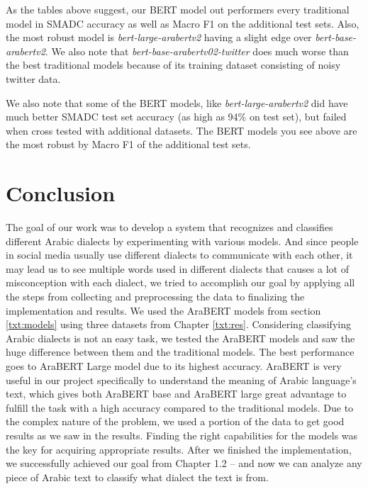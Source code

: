 \documentclass[12pt]{diazessay}
\begin{document}
    As the tables above suggest, our BERT model out performers every traditional model in SMADC accuracy as well as Macro F1 on the additional test sets. Also, the most robust model is \emph{bert-large-arabertv2} having a slight edge over \emph{bert-base-arabertv2}. We also note that \emph{bert-base-arabertv02-twitter} does much worse than the best traditional models because of its training dataset consisting of noisy twitter data.
    
    We also note that some of the BERT models, like \emph{bert-large-arabertv2} did have much better SMADC test set accuracy (as high as 94\% on test set), but failed when cross tested with additional datasets. The BERT models you see above are the most robust by Macro F1 of the additional test sets.
    
    \section {Conclusion}
    The goal of our work was to develop a system that recognizes and classifies different Arabic dialects by experimenting with various models. And since people in social media usually use different dialects to communicate with each other, it may lead us to see multiple words used in different dialects that causes a lot of misconception with each dialect, we tried to accomplish our goal by applying all the steps from collecting and preprocessing the data to finalizing the implementation and results. We used the AraBERT models from section \ref{txt:models} using three datasets from Chapter \ref{txt:res}. Considering classifying Arabic dialects is not an easy task, we tested the AraBERT models and saw the huge difference between them and the traditional models. The best performance goes to AraBERT Large model due to its highest accuracy. AraBERT is very useful in our project specifically to understand the meaning of Arabic language’s text, which gives both AraBERT base and AraBERT large great advantage to fulfill the task with a high accuracy compared to the traditional models. Due to the complex nature of the problem, we used a portion of the data to get good results as we saw in the results. Finding the right capabilities for the models was the key for acquiring appropriate results. After we finished the implementation, we successfully achieved our goal from Chapter 1.2 – and now we can analyze any piece of Arabic text to classify what dialect the text is from.



\newpage
\end{document}
